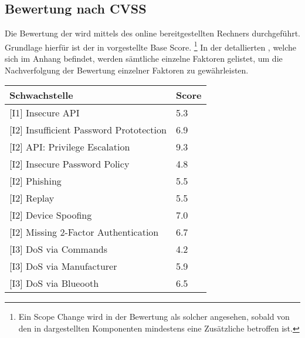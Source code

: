 \subsection{Bewertung nach CVSS}
\label{sec:analysis_cvss}
    Die Bewertung der  wird mittels des online bereitgestellten Rechners\cite{CvssCalc} durchgeführt.
	Grundlage hierfür ist der in  vorgestellte Base Score.
	\footnote{Ein Scope Change wird in der Bewertung als solcher angesehen, sobald von den in  dargestellten Komponenten mindestens eine Zusätzliche betroffen ist.}
	In der detallierten , welche sich im Anhang befindet, werden sämtliche einzelne Faktoren gelistet, um die Nachverfolgung der Bewertung einzelner Faktoren zu gewährleisten.

    \begin{table}[H]
        \centering
        \sffamily
        \begin{tabular}{|l|l|}
        \hline
\textbf{Schwachstelle}                      & \textbf{Score} \\ \hline
\rowcolor{light-gray}
{[}I1{]} Insecure API                       & \cellcolor{orange}5.3            \\ \hline
{[}I2{]} Insufficient Password Prototection & \cellcolor{orange}6.9            \\ \hline
\rowcolor{light-gray}
{[}I2{]} API: Privilege Escalation          & \cellcolor{red}9.3            \\ \hline
{[}I2{]} Insecure Password Policy           & \cellcolor{orange}4.8            \\ \hline
\rowcolor{light-gray}
{[}I2{]} Phishing                           & \cellcolor{orange}5.5            \\ \hline
{[}I2{]} Replay                             & \cellcolor{orange}5.5            \\ \hline
\rowcolor{light-gray}
{[}I2{]} Device Spoofing                    & \cellcolor{redorange}7.0            \\ \hline
{[}I2{]} Missing 2-Factor Authentication    & \cellcolor{orange}6.7            \\ \hline
\rowcolor{light-gray}
{[}I3{]} DoS via Commands                   & \cellcolor{orange}4.2            \\ \hline
{[}I3{]} DoS via Manufacturer               & \cellcolor{orange}5.9            \\ \hline
\rowcolor{light-gray}
{[}I3{]} DoS via Blueooth                   & \cellcolor{orange}6.5            \\ \hline

\end{tabular}
\end{table}
